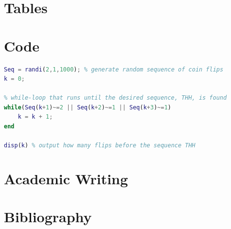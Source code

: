\documentclass[11pt, a4paper]{article}
\begin{document}
\section{Tables}



\section{Code}

\begin{lstlisting}[language=MATLAB]
Seq = randi(2,1,1000); % generate random sequence of coin flips
k = 0;

% while-loop that runs until the desired sequence, THH, is found
while(Seq(k+1)~=2 || Seq(k+2)~=1 || Seq(k+3)~=1)
    k = k + 1;
end

disp(k) % output how many flips before the sequence THH
\end{lstlisting}




\section{Academic Writing} %





\section{Bibliography}
\end{document}
